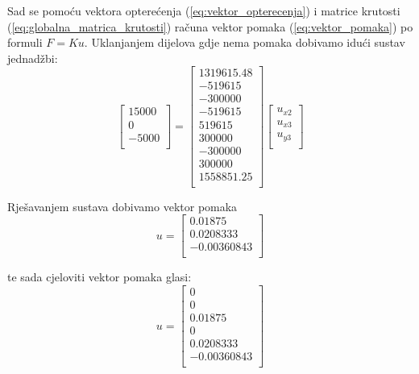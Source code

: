 \documentclass[a4paper,twoside,12pt]{memoir} %
\begin{document}
Sad se pomoću vektora opterećenja (\ref{eq:vektor_opterecenja}) i matrice krutosti (\ref{eq:globalna_matrica_krutosti}) računa vektor pomaka (\ref{eq:vektor_pomaka}) po formuli $F = K  u $. Uklanjanjem dijelova gdje nema pomaka dobivamo idući sustav jednadžbi:
\begin{equation}
\label{eq:racunanje_pomaka}
    \begin{bmatrix}
    15000 \\ 0 \\ -5000 \\
    \end{bmatrix}
    =
    \begin{bmatrix}
    1319615.48 \\ -519615 \\ -300000 \\
    -519615 \\ 519615 \\ 300000 \\
    -300000 \\ 300000 \\ 1558851.25 \\
    \end{bmatrix}
    \begin{bmatrix}
    u_{x2} \\ u_{x3} \\ u_{y3} \\
    \end{bmatrix}
\end{equation}

Rješavanjem sustava dobivamo vektor pomaka
\begin{equation}
\label{eq:vektor_pomaka_kratki}
    u =
    \begin{bmatrix}
    0.01875 \\ 0.0208333 \\ -0.00360843 \\
    \end{bmatrix}
\end{equation}

te sada cjeloviti vektor pomaka glasi:
\begin{equation}
\label{eq:vektor_pomaka_cijeli}
    u =
    \begin{bmatrix}
    0 \\ 0 \\ 0.01875 \\ 0 \\ 0.0208333 \\ -0.00360843 \\
    \end{bmatrix}
\end{equation}
\end{document}
